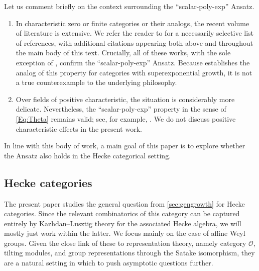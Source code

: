 \documentclass[a4paper,11pt]{amsart}
\numberwithin{equation}{subsection}
\theoremstyle{definition}
\theoremstyle{remark}
\begin{document}
\begin{Remark}
Let us comment briefly on the context surrounding the ``scalar-poly-exp'' Ansatz.
\begin{enumerate}

\item In characteristic zero or finite categories or their analogs, the recent volume of literature is extensive. We refer the reader to \cite{GrTu-growth-diagram, He-growth-finite-groups, HeTu-growth-finite-monoids, HeTu-growth-diagram-monoids, LaPoReSo-growth-qgroup, LuZh-quiver-growth, OST-growth-quantum-groups} for a necessarily selective list of references, with additional citations appearing both above and throughout the main body of this text. Crucially, all of these works, with the sole exception of \cite{GrTu-growth-diagram}, confirm the ``scalar-poly-exp'' Ansatz. Because \cite{GrTu-growth-diagram} establishes the analog of this property for categories with superexponential growth, it is not a true counterexample to the underlying philosophy.

\item Over fields of positive characteristic, the situation is considerably more delicate. Nevertheless, the ``scalar-poly-exp'' property in the sense of \autoref{Eq:Theta} remains valid; see, for example, \cite{CoEtOsTu-growth-fractal, La-char2-story, La-linearly-reductive, She-trivial-summands, She-fractal-tilting-sl2}. We do not discuss positive characteristic effects in the present work.

\end{enumerate}
In line with this body of work, a main goal of this paper is to explore whether the Ansatz also holds in the Hecke categorical setting.
\end{Remark}

\subsection{Hecke categories}\label{sec:affinehecke-defn}

The present paper studies the general question from \autoref{sec:gengrowth} for Hecke categories. Since the relevant combinatorics of this category can be captured entirely by Kazhdan--Lusztig theory for the associated Hecke algebra, we will mostly just work within the latter. We focus mainly on the case of affine Weyl groups. Given the close link of these to representation theory, namely category \(\mathcal O\), tilting modules,
and group representations through the Satake isomorphism, they are a natural setting in which to push
asymptotic questions further.
\end{document}
